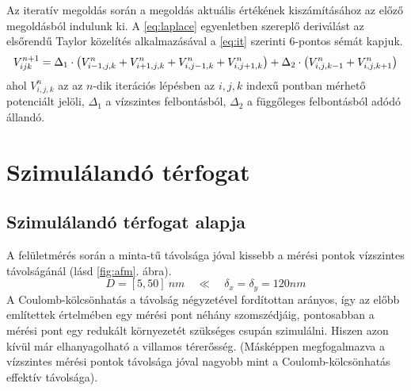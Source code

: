	Az iteratív megoldás során a megoldás aktuális értékének kiszámításához az előző megoldásból indulunk ki.
	A \eqref{eq:laplace} egyenletben szereplő deriválást az elsőrendű Taylor közelítés alkalmazásával a
	\eqref{eq:it} szerinti 6-pontos sémát kapjuk.
	\begin{equation} \label{eq:it} 
		V_{ijk}^{n+1} = \\ \Delta_1 \cdot \left(V_{i-1,j,k}^n+V_{i+1,j,k}^n
		+V_{i,j-1,k}^n+V_{i,j+1,k}^n\right)+ \\
						\Delta_2 \cdot \left(V_{i,j,k-1}^n+V_{i,j,k+1}^n\right)
	\end{equation}
	ahol $V_{i,j,k}^n$ az az $n$-dik iterációs lépésben az $i,j,k$ indexű
	pontban mérhető potenciált jelöli, $\Delta_1$ a vízszintes felbontásból,
	$\Delta_2$ a függőleges felbontásból adódó állandó.
	

	

\section{Szimulálandó térfogat} \label{sec:sim_terfogat}
\subsection{Szimulálandó térfogat alapja}
	A felületmérés során a minta-tű távolsága jóval kissebb a mérési pontok vízszintes távolságánál (lásd \ref{fig:afm}. ábra).
	\begin{equation}
	D=[5,50]\ nm\quad \ll \quad \delta_x=\delta_y=120nm 
	\end{equation}
	A Coulomb-kölcsönhatás a távolság négyzetével fordítottan arányos, így az előbb említettek értelmében egy mérési pont néhány 
	szomszédjáig, pontosabban a mérési pont egy redukált környezetét szükséges csupán szimulálni.
	Hiszen azon kívül már elhanyagolható a villamos térerősség.
	(Másképpen megfogalmazva a vízszintes mérési pontok távolsága jóval nagyobb mint a Coulomb-kölcsönhatás effektív távolsága).
	
